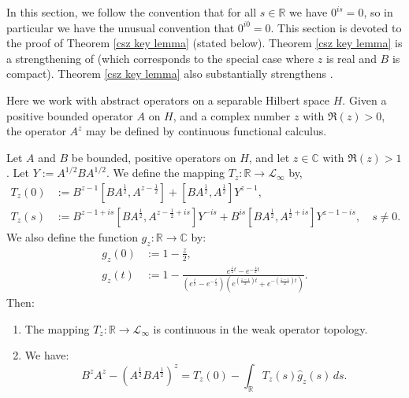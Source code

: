     In this section, we follow the convention that for all $s \in \mathbb{R}$ we have $0^{is}=0$, so in particular we have the unusual convention that $0^{i0} = 0$. 
    This section is devoted to the proof of Theorem \ref{csz key lemma} (stated below). Theorem \ref{csz key lemma} is a strengthening of \cite[Lemma 5.2]{CSZ} (which corresponds to the special
    case where $z$ is real and $B$ is compact). Theorem \ref{csz key lemma} also substantially strengthens \cite[Proposition 4.4]{CGRS1}.
    
    Here we work with abstract operators on a separable Hilbert space $H$. Given a positive bounded operator $A$ on $H$,
    and a complex number $z$ with $\Re(z) > 0$, the operator $A^z$ may be defined by continuous functional calculus.
    \begin{thm}\label{csz key lemma} 
        Let $A$ and $B$ be bounded, positive operators on $H$, and let $z \in \mathbb{C}$ with $\Re(z) > 1$. Let $Y := A^{1/2}BA^{1/2}$.
        We define the mapping $T_z:\mathbb{R}\to \mathcal{L}_\infty$ by,
        \begin{align*}
            T_z(0) &:= B^{z-1}[BA^{\frac{1}{2}},A^{z-\frac{1}{2}}]+[BA^{\frac{1}{2}},A^{\frac{1}{2}}]Y^{z-1},\\
            T_z(s) &:= B^{z-1+is}[BA^{\frac{1}{2}},A^{z-\frac{1}{2}+is}]Y^{-is}+B^{is}[BA^{\frac{1}{2}},A^{\frac{1}{2}+is}]Y^{z-1-is},\quad s \neq 0.
        \end{align*}
        We also define the function $g_z:\mathbb{R}\to \mathbb{C}$ by:
        \begin{align*}
            g_z(0) &:= 1-\frac{z}{2},\\
            g_z(t) &:= 1-\frac{e^{\frac{z}{2}t}-e^{-\frac{z}{2}t}}{(e^{\frac{t}{2}}-e^{-\frac{t}{2}})(e^{\left(\frac{z-1}{2}\right)t}+e^{-\left(\frac{z-1}{2}\right)t})}.
        \end{align*} 
        Then:
        \begin{enumerate}[{\rm (i)}]
            \item{} The mapping $T_z:\mathbb{R}\to \mathcal{L}_\infty$ is continuous in the weak operator topology.
            \item{} We have:
                \begin{equation*}
                    B^zA^z-(A^{\frac{1}{2}}BA^{\frac{1}{2}})^z = T_z(0)-\int_{\mathbb{R}} T_z(s)\widehat{g}_z(s)\,ds. 
                \end{equation*}
        \end{enumerate}
    \end{thm}
    
